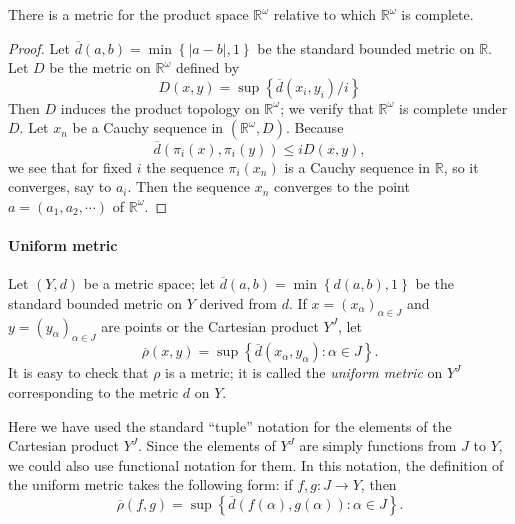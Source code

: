 \begin{theorem}
  There is a metric for the product space \( \mathbb{R}^\omega \) relative to which \( \mathbb{R}^\omega \) is complete.
\end{theorem}
\begin{proof}
  Let \( \overline{d}(a, b) = \min \left\lbrace \left\vert a - b \right\vert, 1 \right\rbrace \) be the standard bounded metric on \( \mathbb{R} \).
  Let \( D \) be the metric on \( \mathbb{R}^\omega \) defined by
  \[
    D(x, y) = \sup \left\lbrace \overline{d}(x_i, y_i) / i \right\rbrace
  \]
  Then \( D \) induces the product topology on \( \mathbb{R}^\omega \); we verify that \( \mathbb{R}^\omega \) is complete under \( D \).
  Let \( x_n \) be a Cauchy sequence in \( (\mathbb{R}^\omega, D) \).
  Because
  \[
    \overline{d}(\pi_i(x), \pi_i(y)) \leq i D(x, y),
  \]
  we see that for fixed \( i \) the sequence \( \pi_i(x_n) \) is a Cauchy sequence in \( \mathbb{R} \), so it converges, say to \( a_i \).
  Then the sequence \( x_n \) converges to the point \( a = (a_1, a_2, \cdots) \) of \( \mathbb{R}^\omega \).
\end{proof}

\paragraph{Uniform metric}

\begin{definition}
  Let \( (Y, d) \) be a metric space;
  let \( \overline{d}(a, b) = \min \left\lbrace d(a, b), 1 \right\rbrace \) be the standard bounded metric on \( Y \) derived from \( d \).
  If \( x = (x_\alpha)_{\alpha \in J} \) and \( y = (y_\alpha)_{\alpha \in J} \) are points or the Cartesian product \( Y^J \), let
  \[
    \overline{\rho}(x, y) = \sup \left\lbrace \overline{d}(x_\alpha, y_\alpha): \alpha \in J \right\rbrace.
  \]
  It is easy to check that \( \rho \) is a metric;
  it is called the \emph{uniform metric} on \( Y^J \) corresponding to the metric \( d \) on \( Y \).
\end{definition}
\begin{remark}
  Here we have used the standard ``tuple'' notation for the elements of the Cartesian product \( Y^J \).
  Since the elements of \( Y^J \) are simply functions from \( J \) to \( Y \), we could also use functional notation for them.
  In this notation, the definition of the uniform metric takes the following form: if \( f, g: J \to Y \), then
  \[
    \overline{\rho}(f, g) = \sup \left\lbrace \overline{d}(f(\alpha), g(\alpha)): \alpha \in J \right\rbrace.
  \]
\end{remark}

